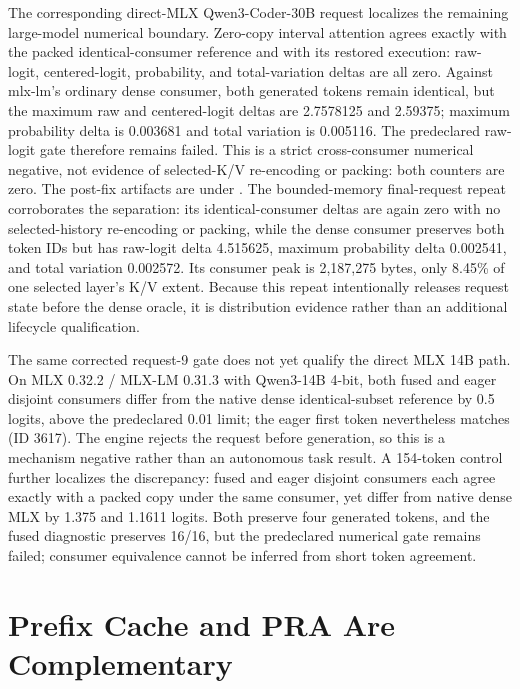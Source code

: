 \documentclass[11pt]{article}
\begin{document}
The corresponding direct-MLX Qwen3-Coder-30B request localizes the remaining
large-model numerical boundary.  Zero-copy interval attention agrees exactly
with the packed identical-consumer reference and with its restored execution:
raw-logit, centered-logit, probability, and total-variation deltas are all
zero.  Against mlx-lm's ordinary dense consumer, both generated tokens remain
identical, but the maximum raw and centered-logit deltas are 2.7578125 and
2.59375; maximum probability delta is 0.003681 and total variation is 0.005116.
The predeclared raw-logit gate therefore remains failed.  This is a strict
cross-consumer numerical negative, not evidence of selected-K/V re-encoding or
packing: both counters are zero.  The post-fix artifacts are under
.
The bounded-memory final-request repeat corroborates the separation: its
identical-consumer deltas are again zero with no selected-history re-encoding
or packing, while the dense consumer preserves both token IDs but has raw-logit
delta 4.515625, maximum probability delta 0.002541, and total variation
0.002572.  Its consumer peak is 2,187,275 bytes, only 8.45\% of one selected
layer's K/V extent.  Because this repeat intentionally releases request state
before the dense oracle, it is distribution evidence rather than an additional
lifecycle qualification.

The same corrected request-9 gate does not yet qualify the direct MLX 14B
path.  On MLX 0.32.2 / MLX-LM 0.31.3 with Qwen3-14B 4-bit, both fused and
eager disjoint consumers differ from the native dense identical-subset
reference by 0.5 logits, above the predeclared 0.01 limit; the eager first
token nevertheless matches (ID 3617).  The engine rejects the request before
generation, so this is a mechanism negative rather than an autonomous task
result.  A 154-token control further localizes the discrepancy: fused and eager
disjoint consumers each agree exactly with a packed copy under the same
consumer, yet differ from native dense MLX by 1.375 and 1.1611 logits.  Both
preserve four generated tokens, and the fused diagnostic preserves 16/16, but
the predeclared numerical gate remains failed; consumer equivalence cannot be
inferred from short token agreement.

\section{Prefix Cache and PRA Are Complementary}
\end{document}
